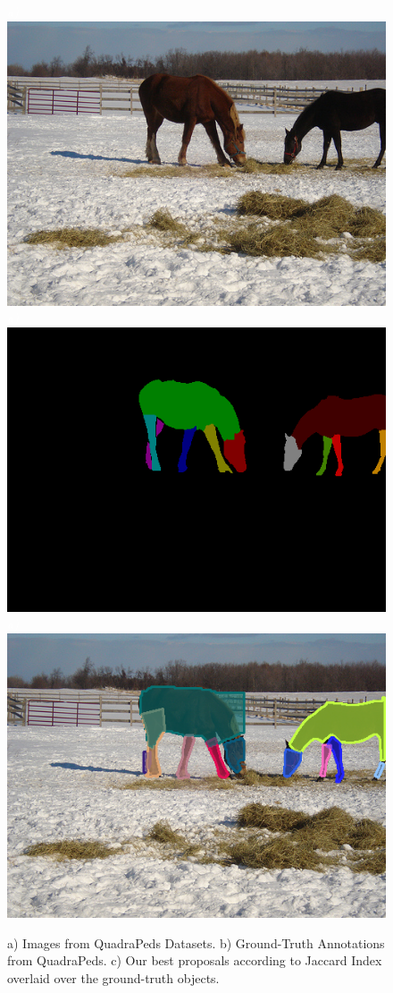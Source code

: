 \begin{figure}[!ht]
{\footnotesize\textit{\textcolor{white}{a)}}}\includegraphics[width=0.30\linewidth]{figs/2009_000931_00.jpg}
{\footnotesize\textit{\textcolor{white}{a)}}}\includegraphics[width=0.30\linewidth]{figs/2009_000931_part_mask.png}
{\footnotesize\textit{\textcolor{white}{a)}}}\includegraphics[width=0.30\linewidth]{figs/2009_000931_mvf.png}




\caption{a) Images from QuadraPeds Datasets. b) Ground-Truth Annotations from QuadraPeds. c) Our best proposals according to Jaccard Index overlaid over the ground-truth objects. }
 \label{fig:part_examples}
 \end{figure}

